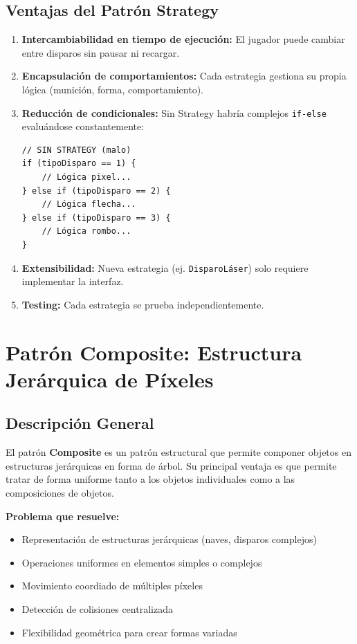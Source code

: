 \documentclass[12pt]{article}
\begin{document}
\subsection{Ventajas del Patrón Strategy}

\begin{enumerate}
    \item \textbf{Intercambiabilidad en tiempo de ejecución:} El jugador puede cambiar entre disparos sin pausar ni recargar.
    
    \item \textbf{Encapsulación de comportamientos:} Cada estrategia gestiona su propia lógica (munición, forma, comportamiento).
    
    \item \textbf{Reducción de condicionales:} Sin Strategy habría complejos \texttt{if-else} evaluándose constantemente:
    \begin{lstlisting}
// SIN STRATEGY (malo)
if (tipoDisparo == 1) {
    // Lógica pixel...
} else if (tipoDisparo == 2) {
    // Lógica flecha...
} else if (tipoDisparo == 3) {
    // Lógica rombo...
}
    \end{lstlisting}
    
    \item \textbf{Extensibilidad:} Nueva estrategia (ej. \texttt{DisparoLáser}) solo requiere implementar la interfaz.
    
    \item \textbf{Testing:} Cada estrategia se prueba independientemente.
\end{enumerate}

\newpage
\section{Patrón Composite: Estructura Jerárquica de Píxeles}

\subsection{Descripción General}

El patrón \textbf{Composite} es un patrón estructural que permite componer objetos en estructuras jerárquicas en forma de árbol. Su principal ventaja es que permite tratar de forma uniforme tanto a los objetos individuales como a las composiciones de objetos.

\textbf{Problema que resuelve:}
\begin{itemize}
    \item Representación de estructuras jerárquicas (naves, disparos complejos)
    \item Operaciones uniformes en elementos simples o complejos
    \item Movimiento coordiado de múltiples píxeles
    \item Detección de colisiones centralizada
    \item Flexibilidad geométrica para crear formas variadas
\end{itemize}
\end{document}
